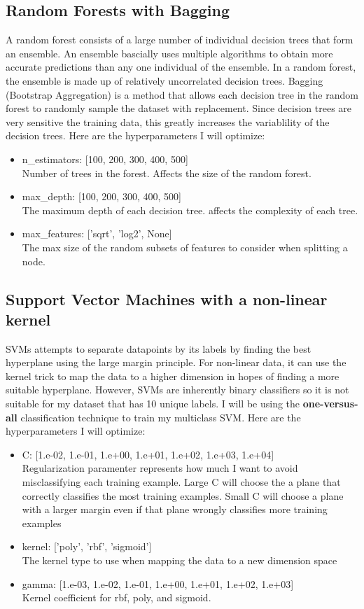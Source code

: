 \documentclass[12pt]{article}
\begin{document}
\subsection{Random Forests with Bagging}
A random forest consists of a large number of individual decision trees that form an ensemble. An ensemble bascially uses multiple algorithms to obtain more accurate predictions than any one individual of the ensemble. In a random forest, the ensemble is made up of relatively uncorrelated decision trees. Bagging (Bootstrap Aggregation) is a method that allows each decision tree in the random forest to randomly sample the dataset with replacement. Since decision trees are very sensitive the training data, this greatly increases the variablility of the decision trees. Here are the hyperparameters I will optimize:
\begin{itemize}
    \item n\_estimators: [100, 200, 300, 400, 500]
    \\ Number of trees in the forest. Affects the size of the random forest.
    \item max\_depth: [100, 200, 300, 400, 500]
    \\ The maximum depth of each decision tree. affects the complexity of each tree.
    \item max\_features: ['sqrt', 'log2', None]
    \\ The max size of the random subsets of features to consider when splitting a node.
\end{itemize}

\subsection{Support Vector Machines with a non-linear kernel}
SVMs attempts to separate datapoints by its labels by finding the best hyperplane using the large margin principle. For non-linear data, it can use the kernel trick to map the data to a higher dimension in hopes of finding a more suitable hyperplane. However, SVMs are inherently binary classifiers so it is not suitable for my dataset that has 10 unique labels. I will be using the \textbf{one-versus-all} classification technique to train my multiclass SVM. Here are the hyperparameters I will optimize:
\begin{itemize}
    \item C: [1.e-02, 1.e-01, 1.e+00, 1.e+01, 1.e+02, 1.e+03, 1.e+04]
    \\ Regularization paramenter represents how much I want to avoid misclassifying each training example. Large C will choose the a plane that correctly classifies the most training examples. Small C will choose a plane with a larger margin even if that plane wrongly classifies more training examples
    \item kernel: ['poly', 'rbf', 'sigmoid'] 
    \\ The kernel type to use when mapping the data to a new dimension space
    \item gamma: [1.e-03, 1.e-02, 1.e-01, 1.e+00, 1.e+01, 1.e+02, 1.e+03]
    \\ Kernel coefficient for rbf, poly, and sigmoid.
\end{itemize}
\end{document}
